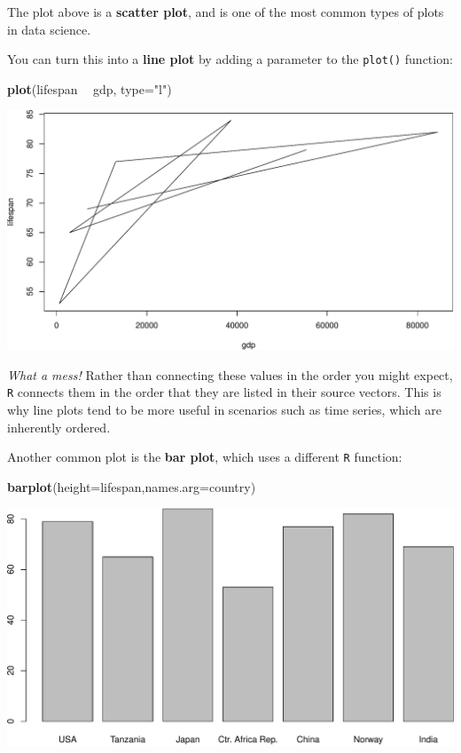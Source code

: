 \documentclass[
]{book}
\newenvironment{Shaded}{\begin{snugshade}}{\end{snugshade}}
\newcommand{\DataTypeTok}[1]{\textcolor[rgb]{0.13,0.29,0.53}{#1}}
\newcommand{\KeywordTok}[1]{\textcolor[rgb]{0.13,0.29,0.53}{\textbf{#1}}}
\newcommand{\NormalTok}[1]{#1}
\newcommand{\OperatorTok}[1]{\textcolor[rgb]{0.81,0.36,0.00}{\textbf{#1}}}
\newcommand{\StringTok}[1]{\textcolor[rgb]{0.31,0.60,0.02}{#1}}
\begin{document}
The plot above is a \textbf{scatter plot}, and is one of the most common types of plots in data science.

You can turn this into a \textbf{line plot} by adding a parameter to the \texttt{plot()} function:

\begin{Shaded}
\begin{Highlighting}[]
\KeywordTok{plot}\NormalTok{(lifespan }\OperatorTok{~}\StringTok{ }\NormalTok{gdp, }\DataTypeTok{type=}\StringTok{"l"}\NormalTok{)}
\end{Highlighting}
\end{Shaded}

\includegraphics{figures/unnamed-chunk-222-1.pdf}

\emph{What a mess!} Rather than connecting these values in the order you might expect, \texttt{R} connects them in the order that they are listed in their source vectors. This is why line plots tend to be more useful in scenarios such as time series, which are inherently ordered.

Another common plot is the \textbf{bar plot}, which uses a different \texttt{R} function:

\begin{Shaded}
\begin{Highlighting}[]
\KeywordTok{barplot}\NormalTok{(}\DataTypeTok{height=}\NormalTok{lifespan,}\DataTypeTok{names.arg=}\NormalTok{country)}
\end{Highlighting}
\end{Shaded}

\includegraphics{figures/unnamed-chunk-223-1.pdf}
\end{document}

